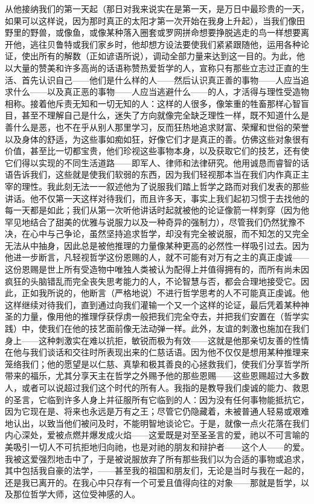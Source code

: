 从他接纳我们的第一天起（那日对我来说实在是第一天，是万日中最珍贵的一天，如果可以这样说，因为那时真正的太阳才第一次开始在我身上升起），当我们像田野里的野兽，或像鱼，或像某种落入圈套或罗网拼命想要挣脱逃走的鸟一样想要离开他，逃往贝鲁特或我们家乡时，他却想方设法要使我们紧紧跟随他，运用各种论证，使出所有的解数（正如谚语所说），调动全部力量来达到这一目的。为此，他以大量的赞美和许多高尚的话语称赞热爱哲学的人，宣称只有那些立志过正直的生活、首先认识自己——他们是什么样的人——然后认识真正善的事物——人应当追求什么——以及真正恶的事物——人应当逃避什么——的人，才活得与理性受造物相称。接着他斥责无知和一切无知的人：这样的人很多，像笨重的牲畜那样心智盲目，甚至不理解自己是什么，迷失了方向就像完全缺乏理性一样，既不知道什么是善什么是恶，也不在乎从别人那里学习，反而狂热地追求财富、荣耀和世俗的荣誉以及身体的舒适，为这些事如痴如狂，好像它们才是真正的善。仿佛这些对象很有价值，甚至比一切都宝贵，他们珍视这些事物本身，以及获取它们的技艺，还有使它们得以实现的不同生活道路——即军人、律师和法律研究。他用诚恳而睿智的话语告诉我们，这些就是使我们软弱的东西，因为我们轻视那本当在我们内作真正主宰的理性。我此刻无法一一叙述他为了说服我们踏上哲学之路而对我们发表的那些讲话。他不仅第一天这样对待我们，而且许多天，事实上我们起初习惯于去找他的每一天都是如此；我们从第一次听他讲话时起就被他的论证像箭一样刺穿（因为他罕见地结合了甜美的优雅与说服力以及一种奇异的强制力），尽管我们仍然犹豫不决，在心中与己争论，虽然坚持追求哲学，却没有完全被说服，而不知怎的又完全无法从中抽身，因此总是被他推理的力量像某种更高的必然性一样吸引过去。因为他进一步断言，凡轻视哲学这份恩赐的人，就不可能有对万有之主的真正虔诚——这份恩赐是世上所有受造物中唯独人类被认为配得上并值得拥有的，而所有尚未因疯狂的头脑错乱而完全丧失思考能力的人，不论智慧与否，都会合理地接受它。因此，正如我所说的，他断言（严格地说）不进行哲学思考的人不可能真正虔诚。他这样继续对待我们，直到通过向我们灌输一个又一个这样的论证，最后凭着某种神圣的力量，像用他的推理俘获俘虏一般把我们完全夺去，并把我们安置在（哲学实践）中，使我们在他的技艺面前像无法动弹一样。此外，友谊的刺激也施加在我们身上——这种刺激实在难以抗拒，敏锐而极为有效——这就是他那亲切友善的性情在他与我们谈话和交往时所表现出来的仁慈话语。因为他不仅仅是想用某种推理来笼络我们；他的愿望是以仁慈、真挚和极其善良的心拯救我们，使我们分享哲学所带来的福乐，尤其分享天主在哲学之外赐予他的那些恩赐——这些恩赐超过大多数人，或者可以说超过我们这个时代的所有人。我指的是教导我们虔诚的能力、救恩的圣言，它临到许多人身上并征服所有它临到的人：因为没有任何事物能抵抗它，因为它现在是、将来也永远是万有之王；尽管它仍隐藏着，未被普通人轻易或艰难地认出，以致当他们被问及时，不能明智地谈论它。于是，就像一点火花落在我们内心深处，爱被点燃并爆发成火焰——这爱既是对至圣圣言的爱，祂以不可言喻的美吸引一切人不可抗拒地归向祂，也是对祂的朋友和辩护者——这个人——的爱。我被这爱强烈地击中了，于是被说服放弃了所有那些我们以为合适的事物或追求，其中包括我自豪的法学，——甚至我的祖国和朋友们，无论是当时与我在一起的，还是我已离开的。在我心中只存有一个可爱且值得向往的对象——那就是哲学，以及那位哲学大师，这位受神感的人。  